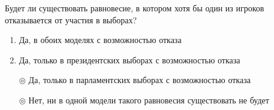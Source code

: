 \solution %

\task Будет ли существовать равновесие, в котором хотя бы один из игроков отказывается от участия в выборах?
\begin{enumerate}[label=$\circ$]
	\item Да, в обоих моделях с возможностью отказа	%
	\item Да, только в президентских выборах с возможностью отказа	%
	\item[$\circledcirc$] Да, только в парламентских выборах с возможностью отказа	%
	\item[$\circledcirc$] Нет, ни в одной модели такого равновесия существовать не будет
\end{enumerate}

\solution %